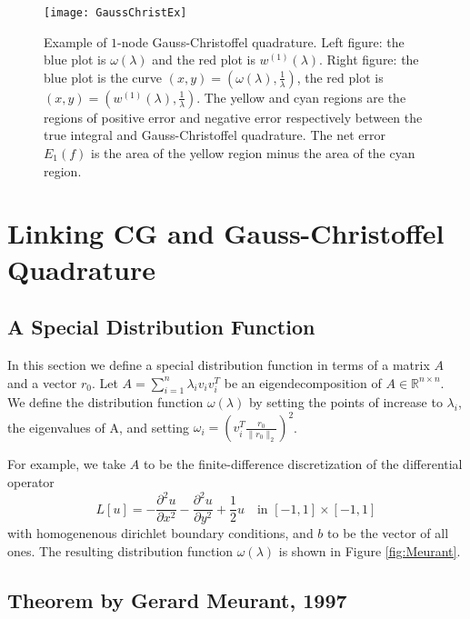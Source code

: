 \documentclass[10pt,a4paper]{article}
\begin{document}
\begin{figure}[h]
  \centering
\texttt{[image: GaussChristEx]}
  \caption{Example of $1$-node Gauss-Christoffel quadrature. Left figure: the blue plot is $\omega(\lambda)$ and the red plot is $w^{(1)}(\lambda)$. Right figure: the blue plot is the curve $(x,y) = \left( \omega(\lambda), \frac{1}{\lambda}\right) $, the red plot is $(x,y) = \left( w^{(1)}(\lambda), \frac{1}{\lambda}\right) $. The yellow and cyan regions are the regions of positive error and negative error respectively between the true integral and Gauss-Christoffel quadrature. The net error $E_1(f)$ is the area of the yellow region minus the area of the cyan region. \label{fig:GaussChristEx}}
\end{figure}




\section{Linking CG and Gauss-Christoffel Quadrature} \label{sec:theorem}

\subsection{A Special Distribution Function}
In this section we define a special distribution function in terms of a matrix $A$ and a vector $r_0$.
Let $A= \sum_{i=1}^n \lambda_i v_i v_i^T$ be an eigendecomposition of $A \in \mathbb{R}^{n \times n}$. 
We define the distribution function $\omega(\lambda)$ by setting the points of increase to $\lambda_i$, the eigenvalues of A, and setting  $\omega_i = \left( v_i^T  \frac{r_0}{\|r_0\|_2}  \right)^2$. 

For example, we take $A$ to be the finite-difference discretization of the differential operator 
\begin{equation} \label{eq:Lu}
L[u] = - \frac{ \partial^2 u }{ \partial x^2 } -  \frac{ \partial^2 u }{ \partial y^2 } + \frac{1}{2} u \quad {\text{in }} \left[ -1 , 1 \right] \times \left[ -1 , 1 \right]  
\end{equation}
 with homogenenous dirichlet boundary conditions, and $b$ to be the vector of all ones. The resulting distribution function $\omega(\lambda)$ is shown in Figure \ref{fig:Meurant}.


\subsection{Theorem by Gerard Meurant, 1997}
\end{document}
